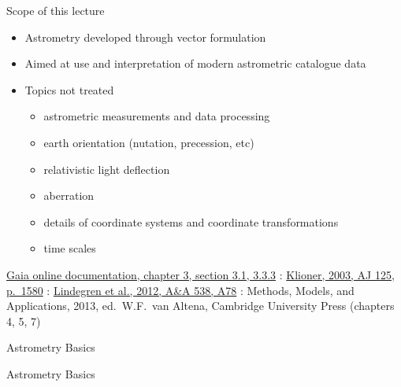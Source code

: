 \documentclass[smaller, aspectratio=169]{beamer}
\begin{document}
\begin{agaframe}{Scope of this lecture}
  \begin{itemize}
    \item Astrometry developed through vector formulation
    \item Aimed at use and interpretation of modern astrometric catalogue data
    \item Topics not treated
      \begin{itemize}
        \item astrometric measurements and data processing
        \item earth orientation (nutation, precession, etc)
        \item relativistic light deflection
        \item aberration
        \item details of coordinate systems and coordinate transformations
        \item time scales
      \end{itemize}
  \end{itemize}

  \bigskip
  \begin{itemize}
    \itemd
      \href{http://gea.esac.esa.int/archive/documentation/GDR2/Data_processing/chap_cu3ast/sec_cu3ast_intro/}{Gaia
      online documentation, chapter 3, section 3.1, 3.3.3}
    :
      \href{http://dx.doi.org/10.1086/367593}{Klioner, 2003, AJ 125, p.~1580}
    : \href{https://doi.org/10.1051/0004-6361/201117905}{Lindegren et
      al., 2012, A\&A 538, A78}
    : Methods, Models, and Applications, 2013, ed.~W.F.~van Altena,
      Cambridge University Press (chapters 4, 5, 7)
  \end{itemize}
\end{agaframe}
%
%
\begin{emptyframe}{Astrometry Basics}
  \begin{center}
    \textcolor{GaiaRed}{\Huge Astrometry Basics}
  \end{center}
\end{emptyframe}
%
%
\end{document}
